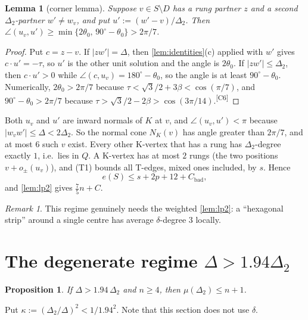 \documentclass[11pt]{amsart}
\newtheorem{lemma}[theorem]{Lemma}
\newtheorem{proposition}[theorem]{Proposition}
\theoremstyle{definition}
\theoremstyle{remark}
\newtheorem{remark}[theorem]{Remark}
\newcommand{\Dt}{\Delta_2}
\newcommand{\mult}{\mu}
\newcommand{\chk}[1]{\textsuperscript{[#1]}}
\begin{document}
\begin{lemma}[corner lemma]\label{lem:corner}
Suppose $v\in S\setminus D$ has a rung partner $z$ and a second $\Dt$-partner $w'\neq w_v$, and put $u':=(w'-v)/\Dt$. Then $\angle(u_v,u')\ge\min\{2\theta_0,\,90^\circ-\theta_0\}>2\pi/7$.
\end{lemma}
\begin{proof}
Put $c=z-v$. If $|zw'|=\Delta$, then \cref{lem:identities}(c) applied with $w'$ gives $c\cdot u'=-\tau$, so $u'$ is the other unit solution and the angle is $2\theta_0$. If $|zw'|\le\Dt$, then $c\cdot u'>0$ while $\angle(c,u_v)=180^\circ-\theta_0$, so the angle is at least $90^\circ-\theta_0$. Numerically, $2\theta_0>2\pi/7$ because $\tau<\sqrt3/2+3\beta<\cos(\pi/7)$, and $90^\circ-\theta_0>2\pi/7$ because $\tau>\sqrt3/2-2\beta>\cos(3\pi/14)$.\chk{C6}
\end{proof}
Both $u_v$ and $u'$ are inward normals of $K$ at $v$, and $\angle(u_v,u')<\pi$ because $|w_vw'|\le\Delta<2\Dt$. So the normal cone $N_K(v)$ has angle greater than $2\pi/7$, and at most $6$ such $v$ exist. Every other K-vertex that has a rung has $\Dt$-degree exactly $1$, i.e.\ lies in $Q$. A K-vertex has at most $2$ rungs (the two positions $v+o_\pm(u_v)$), and (T1) bounds all T-edges, mixed ones included, by $s$. Hence
\[
e(S)\le s+2p+12+C_{\mathrm{bad}},
\]
and \cref{lem:lp2} gives $\frac75n+C$.

\begin{remark}
This regime genuinely needs the weighted \cref{lem:lp2}: a ``hexagonal strip'' around a single centre has average $\delta$-degree $3$ locally.
\end{remark}

\section{The degenerate regime \texorpdfstring{$\Delta>1.94\Dt$}{Delta > 1.94 Delta2}}\label{sec:degenerate}

\begin{proposition}\label{prop:degenerate}
If $\Delta>1.94\,\Dt$ and $n\ge4$, then $\mult(\Dt)\le n+1$.
\end{proposition}

Put $\kappa:=(\Dt/\Delta)^2<1/1.94^2$. Note that this section does not use $\delta$.
\end{document}
